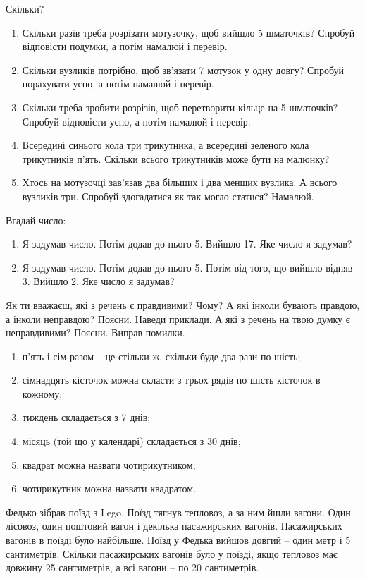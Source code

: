 \problem
Скільки?
\begin{enumerate}
    \item Скільки разів треба розрізати мотузочку, щоб вийшло 5 шматочків?
    Спробуй відповісти подумки, а потім намалюй і перевір.
    \item Скільки вузликів потрібно, щоб зв'язати 7 мотузок у одну довгу?
    Спробуй порахувати усно, а потім намалюй і перевір.
    \item Скільки треба зробити розрізів, щоб перетворити кільце
    на 5 шматочків? Спробуй відповісти усно, а потім намалюй і перевір.
    \item Всередині синього кола три трикутника, а всередині зеленого кола
    трикутників п'ять. Скільки всього трикутників може бути на малюнку?
    \item Хтось на мотузочці зав'язав два більших і два менших вузлика.
    А всього вузликів три. Спробуй здогадатися як так могло статися? Намалюй.
\end{enumerate}


\problem
Вгадай число:
\begin{enumerate}
    \item Я задумав число. Потім додав до нього 5. Вийшло 17.
    Яке число я задумав?
    \item Я задумав число. Потім додав до нього 5.
    Потім від того, що вийшло відняв 3. Вийшло 2.
    Яке число я задумав?
\end{enumerate}


\problem
Як ти вважаєш, які з речень є правдивими? Чому?
А які інколи бувають правдою, а інколи неправдою? Поясни. Наведи приклади.
А які з речень на твою думку є неправдивими? Поясни. Виправ помилки.
\begin{enumerate}
    \item п'ять і сім разом – це стільки ж, скільки буде два рази по шість;
    \item сімнадцять кісточок можна скласти з трьох рядів
    по шість кісточок в кожному;
    \item тиждень складається з 7 днів;
    \item місяць (той що у календарі) складається з 30 днів;
    \item квадрат можна назвати чотирикутником;
    \item чотирикутник можна назвати квадратом.
\end{enumerate}


\problem
Федько зібрав поїзд з Lego. Поїзд тягнув тепловоз, а за ним йшли вагони.
Один лісовоз, один поштовий вагон і декілька пасажирських вагонів.
Пасажирських вагонів в поїзді було найбільше.
Поїзд у Федька вийшов довгий – один метр і 5 сантиметрів.
Скільки пасажирських вагонів було у поїзді,
якщо тепловоз має довжину 25 сантиметрів, а всі вагони – по 20 сантиметрів. 


